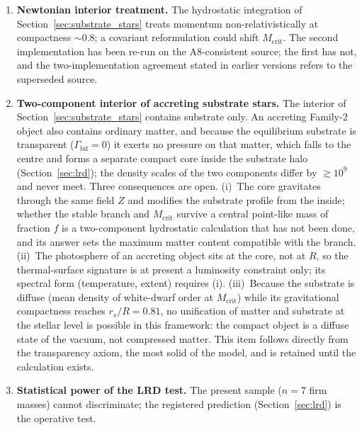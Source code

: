 \documentclass[11pt,a4paper]{article}
\theoremstyle{plain}
\theoremstyle{remark}
\begin{document}
\begin{enumerate}
    \item \textbf{Newtonian interior treatment.} The hydrostatic integration of Section~\ref{sec:substrate_stars} treats momentum non-relativistically at compactness $\sim0.8$; a covariant reformulation could shift $M_{\text{crit}}$. The second implementation has been re-run on the A8-consistent source; the first has not, and the two-implementation agreement stated in earlier versions refers to the superseded source.
    \item \textbf{Two-component interior of accreting substrate stars.} The interior of Section~\ref{sec:substrate_stars} contains substrate only. An accreting Family-2 object also contains ordinary matter, and because the equilibrium substrate is transparent ($\Gamma_{\text{bif}} = 0$) it exerts no pressure on that matter, which falls to the centre and forms a separate compact core inside the substrate halo (Section~\ref{sec:lrd}); the density scales of the two components differ by $\gtrsim 10^{9}$ and never meet. Three consequences are open. (i)~The core gravitates through the same field $Z$ and modifies the substrate profile from the inside; whether the stable branch and $M_{\text{crit}}$ survive a central point-like mass of fraction $f$ is a two-component hydrostatic calculation that has not been done, and its answer sets the maximum matter content compatible with the branch. (ii)~The photosphere of an accreting object sits at the core, not at $R$, so the thermal-surface signature is at present a luminosity constraint only; its spectral form (temperature, extent) requires (i). (iii)~Because the substrate is diffuse (mean density of white-dwarf order at $M_{\text{crit}}$) while its gravitational compactness reaches $r_s/R = 0.81$, no unification of matter and substrate at the stellar level is possible in this framework: the compact object is a diffuse state of the vacuum, not compressed matter. This item follows directly from the transparency axiom, the most solid of the model, and is retained until the calculation exists.
    \item \textbf{Statistical power of the LRD test.} The present sample ($n=7$ firm masses) cannot discriminate; the registered prediction (Section~\ref{sec:lrd}) is the operative test.

\end{enumerate}
\end{document}
